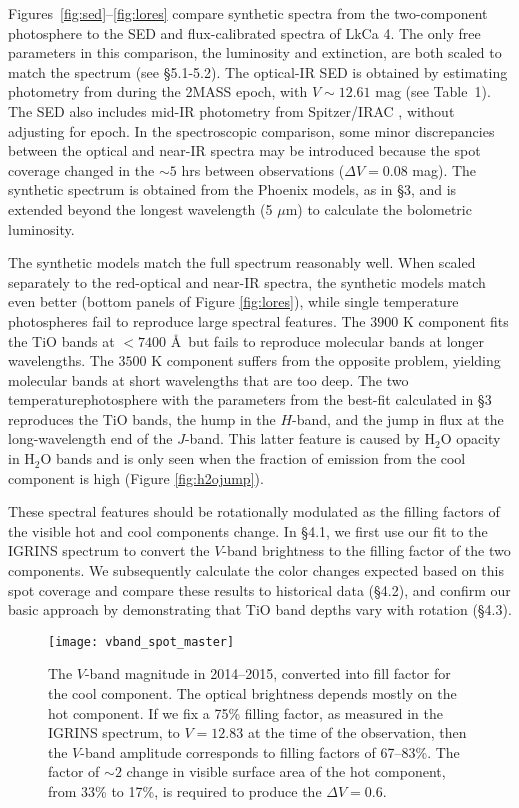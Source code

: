 \documentclass[twocolumn]{emulateapj}%
\begin{document}
Figures~\ref{fig:sed}--\ref{fig:lores} compare synthetic spectra from the two-component photosphere to the SED and flux-calibrated spectra of LkCa 4.  The only free parameters in this comparison, the luminosity and extinction, are both scaled to match the spectrum (see \S 5.1-5.2).  The optical-IR SED is obtained by estimating photometry from \citet{grankin08} during the 2MASS epoch, with $V\sim12.61$ mag (see Table~1).  The SED also includes mid-IR photometry from Spitzer/IRAC \citep{hartmann05}, without adjusting for epoch.  In the spectroscopic comparison, some minor discrepancies between the optical and near-IR spectra may be introduced because the spot coverage changed in the $\sim 5$ hrs between observations ($\Delta V=0.08$ mag).  The synthetic spectrum is obtained from the Phoenix models, as in \S 3, and is extended beyond the longest wavelength (5 $\mu$m) to calculate the bolometric luminosity.

The synthetic models match the full spectrum reasonably well.  When scaled separately to the red-optical and near-IR spectra, the synthetic models match even better (bottom panels of Figure \ref{fig:lores}), while single temperature photospheres fail to reproduce large spectral features.   The $3900$ K component fits the TiO bands at $<7400$ \AA\ but fails to reproduce molecular bands at longer wavelengths.  The $3500$ K component suffers from the opposite problem, yielding molecular bands at short wavelengths that are too deep.  The two temperaturephotosphere with the parameters from the best-fit calculated in \S 3 reproduces the TiO bands, the hump in the $H$-band, and the jump in flux at the long-wavelength end of the $J$-band.  This latter feature is caused by H$_2$O opacity in H$_2$O bands and is only seen when the fraction of emission from the cool component is high (Figure \ref{fig:h2ojump}).

These spectral features should be rotationally modulated as the filling factors of the visible hot and cool components change.    In \S 4.1, we first use our fit to the IGRINS spectrum to convert the $V$-band brightness to the filling factor of the two components.  We subsequently calculate the color changes expected based on this spot coverage and compare these results to historical data (\S 4.2), and confirm our basic approach by demonstrating that TiO band depths vary with rotation (\S 4.3).



\begin{figure*}
 \centering
 \texttt{[image: vband\_spot\_master]}
\caption{The $V$-band magnitude in 2014--2015, converted into fill factor for the cool component.  The optical brightness depends mostly on the hot component.  If we fix a 75\% filling factor, as measured in the IGRINS spectrum, to $V=12.83$ at the time of the observation, then the $V$-band amplitude  corresponds to filling factors of 67--83\%.  The factor of $\sim 2$ change in visible surface area of the hot component, from 33\% to 17\%, is required to produce the $\Delta V=0.6$. }
\label{fig:vband_spot}
\end{figure*}
\end{document}
